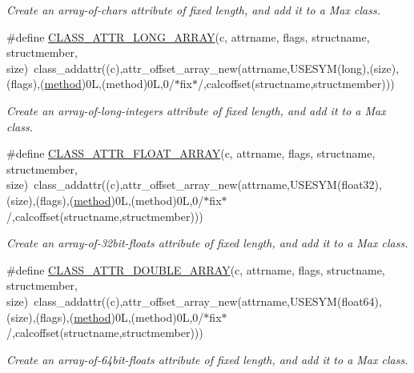 \begin{DoxyCompactItemize}
\begin{DoxyCompactList}\small\item\em Create an array-\/of-\/chars attribute of fixed length, and add it to a Max class. \item\end{DoxyCompactList}\item 
\#define \hyperlink{group__attr_ga94e513437526908f50ab3262c4518139}{CLASS\_\-ATTR\_\-LONG\_\-ARRAY}(c, attrname, flags, structname, structmember, size)~class\_\-addattr((c),attr\_\-offset\_\-array\_\-new(attrname,USESYM(long),(size),(flags),(\hyperlink{group__datatypes_gac26ba0a173b50597f5738132e059b42d}{method})0L,(method)0L,0/$\ast$fix$\ast$/,calcoffset(structname,structmember)))
\begin{DoxyCompactList}\small\item\em Create an array-\/of-\/long-\/integers attribute of fixed length, and add it to a Max class. \item\end{DoxyCompactList}\item 
\#define \hyperlink{group__attr_ga9cae895f2db30944f0e420ed2a32c825}{CLASS\_\-ATTR\_\-FLOAT\_\-ARRAY}(c, attrname, flags, structname, structmember, size)~class\_\-addattr((c),attr\_\-offset\_\-array\_\-new(attrname,USESYM(float32),(size),(flags),(\hyperlink{group__datatypes_gac26ba0a173b50597f5738132e059b42d}{method})0L,(method)0L,0/$\ast$fix$\ast$/,calcoffset(structname,structmember)))
\begin{DoxyCompactList}\small\item\em Create an array-\/of-\/32bit-\/floats attribute of fixed length, and add it to a Max class. \item\end{DoxyCompactList}\item 
\#define \hyperlink{group__attr_ga4ea6da1996edbfab4d607a61a2cdd3ec}{CLASS\_\-ATTR\_\-DOUBLE\_\-ARRAY}(c, attrname, flags, structname, structmember, size)~class\_\-addattr((c),attr\_\-offset\_\-array\_\-new(attrname,USESYM(float64),(size),(flags),(\hyperlink{group__datatypes_gac26ba0a173b50597f5738132e059b42d}{method})0L,(method)0L,0/$\ast$fix$\ast$/,calcoffset(structname,structmember)))
\begin{DoxyCompactList}\small\item\em Create an array-\/of-\/64bit-\/floats attribute of fixed length, and add it to a Max class. \item\end{DoxyCompactList}\item 

\end{DoxyCompactItemize}
